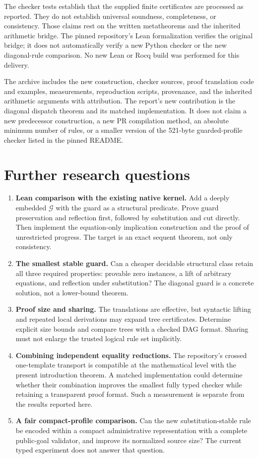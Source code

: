 \documentclass[11pt]{article}
\theoremstyle{definition}
\theoremstyle{remark}
\begin{document}
The checker tests establish that the supplied finite certificates are
processed as reported. They do not establish universal soundness,
completeness, or consistency. Those claims rest on the written
metatheorems and the inherited arithmetic bridge. The pinned repository's
Lean formalization verifies the original bridge; it does not automatically
verify a new Python checker or the new diagonal-rule comparison.
No new Lean or Rocq build was performed for this delivery.

The archive includes the new construction, checker sources, proof
translation code and examples, measurements, reproduction scripts,
provenance, and the inherited arithmetic arguments with attribution.
The report's new contribution is the diagonal dispatch theorem and its
matched implementation. It does not claim a new predecessor construction,
a new PR compilation method, an absolute minimum number of rules, or a
smaller version of the 521-byte guarded-profile checker listed in the pinned README.

\section{Further research questions}
\label{sec:research}

\begin{enumerate}
\item \textbf{Lean comparison with the existing native kernel.}
Add a deeply embedded \(\mathcal G\) with the guard as a structural
predicate. Prove guard preservation and reflection first, followed by
substitution and cut directly. Then implement the equation-only
implication construction and the proof of unrestricted progress.
The target is an exact sequent theorem, not only consistency.
\item \textbf{The smallest stable guard.}
Can a cheaper decidable structural class retain all three required
properties: provable zero instances, a lift of arbitrary equations,
and reflection under substitution? The diagonal guard is a concrete
solution, not a lower-bound theorem.
\item \textbf{Proof size and sharing.}
The translations are effective, but syntactic lifting and repeated local
derivations may expand tree certificates. Determine explicit size bounds
and compare trees with a checked DAG format. Sharing must not enlarge the
trusted logical rule set implicitly.
\item \textbf{Combining independent equality reductions.}
The repository's crossed one-template transport is compatible at the
mathematical level with the present introduction theorem. A matched
implementation could determine whether their combination improves the
smallest fully typed checker while retaining a transparent proof format.
Such a measurement is separate from the results reported here.
\item \textbf{A fair compact-profile comparison.}
Can the new substitution-stable rule be encoded within a compact
administrative representation with a complete public-goal validator,
and improve its normalized source size? The current typed experiment
does not answer that question.
\end{enumerate}
\end{document}
